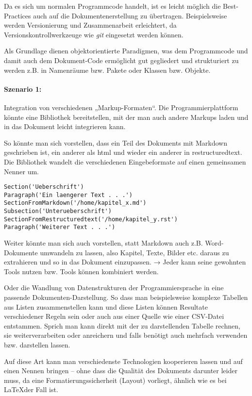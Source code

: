Da es sich um normalen Programmcode handelt, ist es leicht möglich die
Best-Practices auch auf die Dokumentenerstellung zu übertragen.
Beispielsweise werden Versionierung und Zusammenarbeit erleichtert,
da Versionskontrollwerkzeuge wie \emph{git} eingesetzt werden können.

Als Grundlage dienen objektorientierte Paradigmen, was dem Programmcode
und damit auch dem Dokument-Code ermöglicht gut gegliedert und strukturiert
zu werden z.B. in Namenräume bzw. Pakete oder Klassen bzw. Objekte.

\paragraph{Szenario 1:} Integration von verschiedenen „Markup-Formaten“.
Die Programmierplattform könnte eine Bibliothek bereitstellen, mit der
man auch andere Markups laden und in das Dokument leicht integrieren
kann.

So könnte man sich vorstellen, dass ein Teil des Dokuments mit Markdown
geschrieben ist, ein anderer als html und wieder ein anderer in
restructuredtext. Die Bibliothek wandelt die verschiedenen Eingebeformate
auf einen gemeinsamen Nenner um.

\begin{verbatim}
Section('Ueberschrift')
Paragraph('Ein laengerer Text . . .')
SectionFromMarkdown('/home/kapitel_x.md')
Subsection('Unterueberschrift')
SectionFromRestructuredtext('/home/kapitel_y.rst')
Paragraph('Weiterer Text . . .')
\end{verbatim}

Weiter könnte man sich auch vorstellen, statt Markdown auch z.B. Word-Dokumente
umwandeln zu lassen, also Kapitel, Texte, Bilder etc. daraus zu extrahieren und so in
das Dokument einzupassen. → Jeder kann seine gewohnten Tools nutzen bzw.
Tools können kombiniert werden.

Oder die Wandlung von Datenstrukturen der Programmiersprache in eine passende
Dokumenten-Darstellung. So dass man beispielsweise komplexe Tabellen aus
Listen zusammenstellen kann und diese Listen können Resultate
verschiedener Regeln sein oder auch aus einer Quelle wie einer CSV-Datei
entstammen. Sprich man kann direkt mit der zu darstellenden Tabelle
rechnen, sie weiterverarbeiten oder anreichern und falls benötigt auch
mehrfach verwenden bzw. darstellen lassen.

Auf diese Art kann man verschiedenste Technologien kooperieren lassen und
auf einen Nennen bringen -- ohne dass die Qualität des Dokuments darunter
leider muss, da eine Formatierungssicherheit (Layout) vorliegt,
ähnlich wie es bei \LaTeX der Fall ist.


